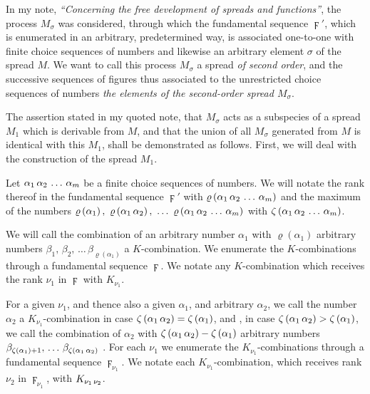 \documentclass{amsart}
\newcommand\Rank[1]{\varrho\left(#1\right)}
\newcommand\Max[1]{\zeta\left(#1\right)}
\begin{document}


In my note, \emph{``Concerning the free development of spreads and
functions''}, the process $M_\sigma$ was considered, through which
the fundamental sequence $\digamma'$, which is enumerated in an arbitrary,
predetermined way, is associated one-to-one with finite choice sequences of
numbers and likewise an arbitrary element $\sigma$ of the spread $M$. We want to call this process $M_\sigma$ a
spread \emph{of second order}, and the successive sequences of figures thus
associated to the unrestricted choice sequences of numbers  \emph{the elements of the second-order spread $M_\sigma$}.

The assertion stated in my quoted note, that $M_\sigma$ acts as a subspecies of
a spread $M_1$ which is derivable from $M$, and that the union of all
$M_\sigma$ generated from $M$ is identical with this $M_1$, shall be
demonstrated as follows. First, we will deal with the construction of the
spread $M_1$.

Let $\Sequence{\alpha_1, \alpha_2, \dots, \alpha_m}$ be a finite choice
sequences of numbers. We will notate the rank thereof in the fundamental
sequence $\digamma'$ with $\Rank{\Sequence{\alpha_1,\alpha_2,\dots,\alpha_m}}$
and the maximum of the numbers $\Rank{\alpha_1},\
\Rank{\Sequence{\alpha_1,\alpha_2}},\ \dots\
\Rank{\Sequence{\alpha_1,\alpha_2,\dots,\alpha_m}}$ with
$\Max{\Sequence{\alpha_1,\alpha_2,\dots,\alpha_m}}$.

We will call the combination of an arbitrary number $\alpha_1$ with
$\Rank{\alpha_1}$ arbitrary numbers
$\beta_1,\,\beta_2,\,\dots\,\beta_{\Rank{\alpha_1}}$ a $K$-combination. We
enumerate the $K$-combinations through a fundamental sequence $\digamma$. We
notate any $K$-combination which receives the rank $\nu_1$ in $\digamma$ with
$K_{\nu_1}$.

For a given $\nu_1$, and thence also a given $\alpha_1$, and arbitrary
$\alpha_2$, we call the number $\alpha_2$ a $K_{\nu_1}$-combination in case
$\Max{\Sequence{\alpha_1,\alpha_2}} = \Max{\alpha_1}$, and ,
in case $\Max{\Sequence{\alpha_1,\alpha_2}} > \Max{\alpha_1}$, we call the
combination of $\alpha_2$ with $\Max{\Sequence{\alpha_1,\alpha_2}} -
\Max{\alpha_1}$ arbitrary numbers
$\beta_{\Max{\alpha_1}+1},\,\dots\,\beta_{\Max{\Sequence{\alpha_1,\alpha_2}}}$
\EdMark{a $K_{\nu_1}$-combination}. For each $\nu_1$ we enumerate the
$K_{\nu_1}$-combinations through a fundamental sequence $\digamma_{\nu_1}$. We
notate each $K_{\nu_1}$-combination, which receives rank $\nu_2$ in
$\digamma_{\nu_1}$, with $K_{\Sequence{\nu_1,\nu_2}}$.
\end{document}
